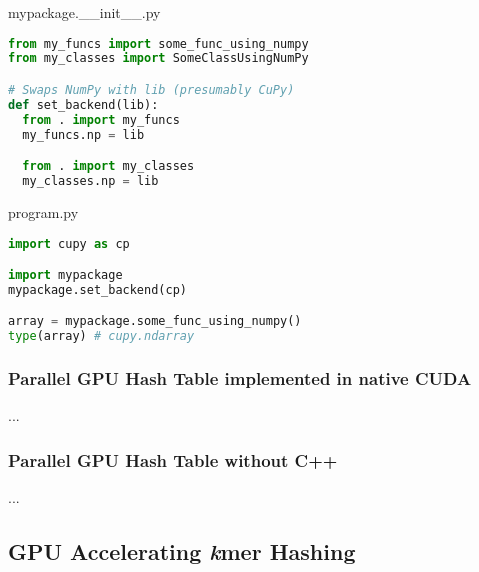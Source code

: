 \begin{center}
mypackage.\_\_init\_\_.py
\end{center}
\begin{lstlisting}[language=Python,style=pycode]
from my_funcs import some_func_using_numpy
from my_classes import SomeClassUsingNumPy 

# Swaps NumPy with lib (presumably CuPy)
def set_backend(lib):
  from . import my_funcs
  my_funcs.np = lib

  from . import my_classes
  my_classes.np = lib
\end{lstlisting}

\begin{center}
program.py
\end{center}
\begin{lstlisting}[language=Python,style=pycode]
import cupy as cp

import mypackage
mypackage.set_backend(cp)

array = mypackage.some_func_using_numpy()
type(array) # cupy.ndarray
\end{lstlisting}


\subsubsection{Parallel GPU Hash Table implemented in native CUDA}
...

\subsubsection{Parallel GPU Hash Table without C++}
...

\subsection{GPU Accelerating \textit{k}mer Hashing}



